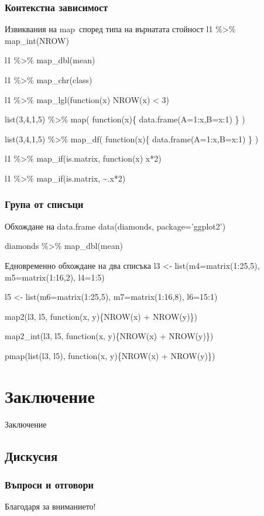 \documentclass{beamer}
\begin{document}
\begin{frame}
\frametitle{Контекстна зависимост}
\begin{block}{Извиквания на map\, според типа на върнатата стойност}
l1 \%>\% map\_int(NROW)

l1 \%>\% map\_dbl(mean)

l1 \%>\% map\_chr(class)

l1 \%>\% map\_lgl(function(x) NROW(x) < 3)

list(3,4,1,5) \%>\% map( function(x)\{ data.frame(A=1:x,B=x:1) \} )

list(3,4,1,5) \%>\% map\_df( function(x)\{ data.frame(A=1:x,B=x:1) \} )

l1 \%>\% map\_if(is.matrix, function(x) x*2)

l1 \%>\% map\_if(is.matrix, \textasciitilde  .x*2)
\end{block}
\end{frame}

\begin{frame}
\frametitle{Група от списъци}
\begin{block}{Обхождане на data.frame}
data(diamonds, package='ggplot2')

diamonds \%>\% map\_dbl(mean)
\end{block}

\begin{block}{Едновременно обхождане на два списъка}
l3 <- list(m4=matrix(1:25,5), m5=matrix(1:16,2), l4=1:5)

l5 <- list(m6=matrix(1:25,5), m7=matrix(1:16,8), l6=15:1)

map2(l3, l5, function(x, y)\{NROW(x) + NROW(y)\})

map2\_int(l3, l5, function(x, y)\{NROW(x) + NROW(y)\})

pmap(list(l3, l5), function(x, y)\{NROW(x) + NROW(y)\})
\end{block}
\end{frame}

\section{Заключение}

\begin{frame}
\center \huge{Заключение}
\end{frame}

\subsection{Дискусия}

\begin{frame}
\frametitle{Въпроси и отговори}
\center \huge{Благодаря за вниманието!}
\end{frame}
\end{document}
